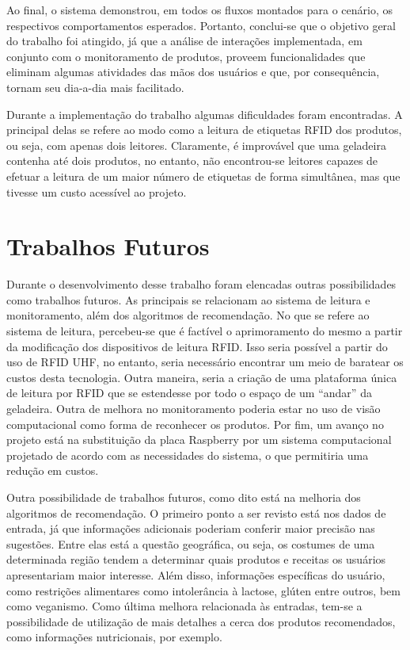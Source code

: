 Ao final, o sistema demonstrou, em todos os fluxos montados para o cenário, os respectivos comportamentos esperados. Portanto, conclui-se que o objetivo geral do trabalho foi atingido, já que a análise de interações implementada, em conjunto com o monitoramento de produtos, proveem funcionalidades que eliminam algumas atividades das mãos dos usuários e que, por consequência, tornam seu dia-a-dia mais facilitado. 

Durante a implementação do trabalho algumas dificuldades foram encontradas. A principal delas se refere ao modo como a leitura de etiquetas RFID dos produtos, ou seja, com apenas dois leitores. Claramente, é improvável que uma geladeira contenha até dois produtos, no entanto, não encontrou-se leitores capazes de efetuar a leitura de um maior número de etiquetas de forma simultânea, mas que tivesse um custo acessível ao projeto.



\section{Trabalhos Futuros}

Durante o desenvolvimento desse trabalho foram elencadas outras possibilidades como trabalhos futuros. As principais se relacionam ao sistema de leitura e monitoramento, além dos algoritmos de recomendação. No que se refere ao sistema de leitura, percebeu-se que é factível o aprimoramento do mesmo a partir da modificação dos dispositivos de leitura RFID. Isso seria possível a partir do uso de RFID UHF, no entanto, seria necessário encontrar um meio de baratear os custos desta tecnologia. Outra maneira, seria a criação de uma plataforma única de leitura por RFID que se estendesse por todo o espaço de um ``andar'' da geladeira. Outra de melhora no monitoramento poderia estar no uso de visão computacional como forma de reconhecer os produtos. Por fim, um avanço no projeto está na substituição da placa Raspberry\textsuperscript{\textregistered} por um sistema computacional projetado de acordo com as necessidades do sistema, o que permitiria uma redução em custos.

Outra possibilidade de trabalhos futuros, como dito está na melhoria dos algoritmos de recomendação. O primeiro ponto a ser revisto está nos dados de entrada, já que informações adicionais poderiam conferir maior precisão nas sugestões. Entre elas está a questão geográfica, ou seja, os costumes de uma determinada região tendem a determinar quais produtos e receitas os usuários apresentariam maior interesse. Além disso, informações específicas do usuário, como restrições alimentares como intolerância à lactose, glúten entre outros, bem como veganismo. Como última melhora relacionada às entradas, tem-se a possibilidade de utilização de mais detalhes a cerca dos produtos recomendados, como informações nutricionais, por exemplo. 

